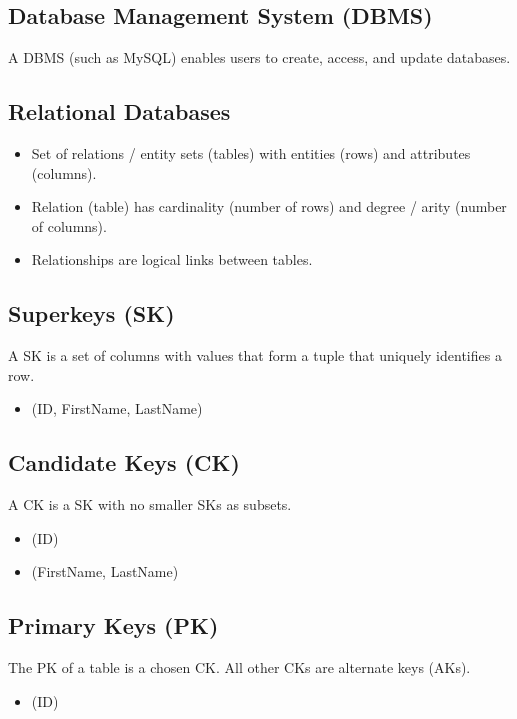 \documentclass[12pt, a4paper]{article}
\begin{document}
    \subsection{Database Management System (DBMS)}
    A DBMS (such as MySQL) enables users to create, access, and update 
    databases. 

    \subsection{Relational Databases}
    \begin{itemize}
        \item Set of relations / entity sets (tables) with entities (rows) and 
        attributes (columns). 
        \item Relation (table) has cardinality (number of rows) and degree / 
        arity (number of columns). 
        \item Relationships are logical links between tables. 
    \end{itemize}

    \subsection{Superkeys (SK)}
    A SK is a set of columns with values that form a tuple that uniquely 
    identifies a row. 
    \begin{itemize}
        \item (ID, FirstName, LastName)
    \end{itemize}

    \subsection{Candidate Keys (CK)}
    A CK is a SK with no smaller SKs as subsets. 
    \begin{itemize}
        \item (ID)
        \item (FirstName, LastName)
    \end{itemize}

    \subsection{Primary Keys (PK)}
    The PK of a table is a chosen CK. All other CKs are alternate keys (AKs). 
    \begin{itemize}
        \item (ID)
    \end{itemize}
\end{document}
